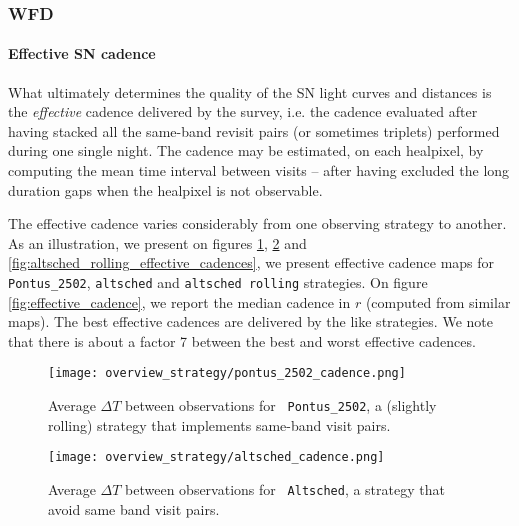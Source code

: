 \subsubsection {WFD}
\label{sec:wfd_cadence_key_properties}

\paragraph{Effective SN cadence} What ultimately determines the quality of the SN light curves
and distances is the {\em effective} cadence delivered by the survey,
i.e.  the cadence evaluated after having stacked all the same-band
revisit pairs (or sometimes triplets) performed during one single night. The cadence may be estimated, on each
healpixel, by computing the mean time interval between visits -- after
having excluded the long duration gaps when the healpixel is not
observable.

The effective cadence varies considerably from one observing strategy
to another.  As an illustration, we present on figures
\ref{fig:pontus_2502_effective_cadences},
\ref{fig:altsched_effective_cadences} and
\ref{fig:altsched_rolling_effective_cadences}, we present effective
cadence maps for {\tt Pontus\_2502}, {\tt altsched} and {\tt altsched
  rolling} strategies.  On figure \ref{fig:effective_cadence}, we
report the median cadence in $r$ (computed from similar maps).  The
best effective cadences are delivered by the \altsched like
strategies. We note that there is about a factor 7 between the best
and worst effective cadences.

\begin{figure}
  \begin{center}
    \texttt{[image: overview\_strategy/pontus\_2502\_cadence.png]}
    \caption{Average $\Delta T$ between observations for {\tt
        Pontus\_2502}, a (slightly rolling) strategy that implements
      same-band visit pairs. }
    \label{fig:pontus_2502_effective_cadences}
  \end{center}
\end{figure}


\begin{figure}
  \begin{center}
    \texttt{[image: overview\_strategy/altsched\_cadence.png]}
    \caption{Average $\Delta T$ between observations for {\tt
        Altsched}, a strategy that avoid same band visit pairs.}
    \label{fig:altsched_effective_cadences}
  \end{center}
\end{figure}


